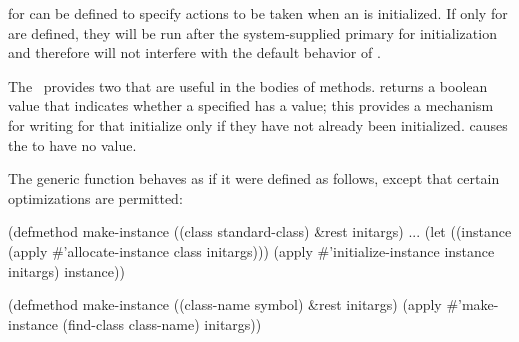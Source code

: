  for  can be defined to specify
actions to be taken when an  is initialized.  
If only  for  are defined, they will be
run after the system-supplied primary  for initialization and
therefore will not interfere with the default behavior of 
.

The \OS\ provides two  that are useful in the bodies of 
 methods.  
returns a boolean value that indicates whether a specified  has a
value; this provides a mechanism for writing  for
 that initialize  only if they have
not already been initialized.  
causes the  to have no value.

\endsubsection%

                      
The generic function  behaves as if it were defined as
follows, except that certain optimizations are permitted:

\code
 (defmethod make-instance ((class standard-class) &rest initargs)
   ...
   (let ((instance (apply #'allocate-instance class initargs)))
     (apply #'initialize-instance instance initargs)
     instance))

 (defmethod make-instance ((class-name symbol) &rest initargs)
   (apply #'make-instance (find-class class-name) initargs))
\endcode

                                      
